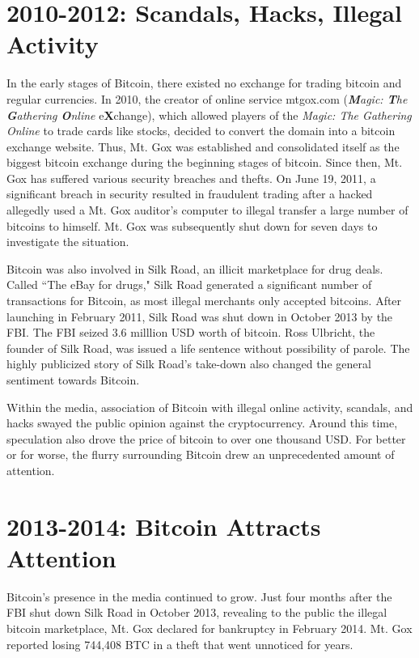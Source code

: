 \documentclass[11pt]{article}
\begin{document}
    \section*{2010-2012: Scandals, Hacks, Illegal Activity}
    In the early stages of Bitcoin, there existed no exchange for trading bitcoin and regular currencies. In 2010, the creator of online service mtgox.com (\emph{\textbf{M}agic: \textbf{T}he \textbf{G}athering \textbf{O}nline} e\textbf{X}change), which allowed players of the \emph{Magic: The Gathering Online} to trade cards like stocks, decided to convert the domain into a bitcoin exchange website. Thus, Mt. Gox was established and consolidated itself as the biggest bitcoin exchange during the beginning stages of bitcoin. Since then, Mt. Gox has suffered various security breaches and thefts. On June 19, 2011, a significant breach in security resulted in fraudulent trading after a hacked allegedly used a Mt. Gox auditor's computer to illegal transfer a large number of bitcoins to himself. Mt. Gox was subsequently shut down for seven days to investigate the situation.
    
    Bitcoin was also involved in Silk Road, an illicit marketplace for drug deals. Called ``The eBay for drugs," Silk Road generated a significant number of transactions for Bitcoin, as most illegal merchants only accepted bitcoins. After launching in February 2011, Silk Road was shut down in October 2013 by the FBI. The FBI seized 3.6 milllion USD worth of bitcoin. Ross Ulbricht, the founder of Silk Road, was issued a life sentence without possibility of parole. The highly publicized story of Silk Road's take-down also changed the general sentiment towards Bitcoin.
    
    Within the media, association of Bitcoin with illegal online activity, scandals, and hacks swayed the public opinion against the cryptocurrency. Around this time, speculation also drove the price of bitcoin to over one thousand USD. For better or for worse, the flurry surrounding Bitcoin drew an unprecedented amount of attention.
    \section*{2013-2014: Bitcoin Attracts Attention}
    
    Bitcoin's presence in the media continued to grow. Just four months after the FBI shut down Silk Road in October 2013, revealing to the public the illegal bitcoin marketplace, Mt. Gox declared for bankruptcy in February 2014. Mt. Gox reported losing 744,408 BTC in a theft that went unnoticed for years.
    
\end{document}
